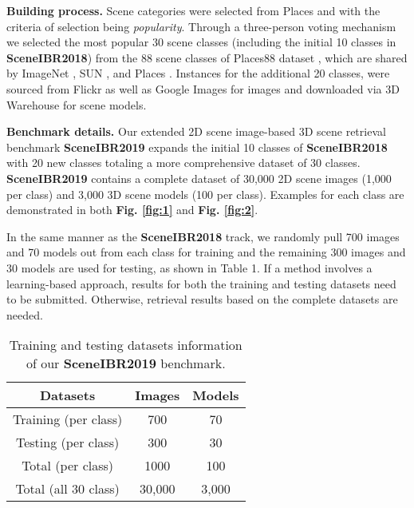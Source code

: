 \documentclass[../main.tex]{subfiles}
\begin{document}
\textbf{Building process.} 
Scene categories were selected from  Places \cite{zhou2017places} and with the criteria of selection being \textit{popularity}. Through a three-person voting mechanism we selected the most popular 30 scene classes (including the initial 10 classes in \textbf{SceneIBR2018}) from the 88 scene classes of Places88 dataset \cite{Places88}, which are shared by ImageNet \cite{ImageNet}, SUN \cite{SUN}, and Places \cite{zhou2017places}. 
Instances for the additional 20 classes, were sourced from Flickr \cite{Flickr} as well as Google Images\cite{GoogleImages} for images and downloaded via 3D Warehouse \cite{3DWarehouse} for scene models. 

\textbf{Benchmark details.} Our extended 2D scene image-based 3D scene retrieval benchmark \textbf{SceneIBR2019} expands the initial 10 classes of \textbf{SceneIBR2018} with 20 new classes totaling a more comprehensive dataset of 30 classes. \textbf{SceneIBR2019} contains a complete dataset of 30,000 2D scene images (1,000 per class) and 3,000 3D scene models (100 per class). Examples for each class are demonstrated in both \textbf{Fig. \ref{fig:1}} and \textbf{Fig. \ref{fig:2}}.

In the same manner as the \textbf{SceneIBR2018} track, we randomly pull 700 images and 70 models out from each class for training and the remaining 300 images and 30 models are used for testing, as shown in Table 1. If a method involves a learning-based approach, results for both the training and testing datasets need to be submitted. Otherwise, retrieval results based on the complete datasets are needed.


\begin{table}[h]
	\centering
	\caption{Training and testing datasets information of our \textbf{SceneIBR2019} benchmark.}
	\begin{center}
		\begin{tabular}  {|c|c|c|}
			\hline
			\textbf{\normalsize{Datasets}} & \textbf{\normalsize{Images}} & \textbf{\normalsize{Models}}\\
			\hline
			\normalsize{Training (per class)}  & 700  & 70  \\
			\hline
			\normalsize{Testing (per class)}  & 300  & 30  \\
			\hline
			\normalsize{Total (per class)}  & 1000  & 100  \\
			\hline
			\normalsize{Total (all 30 class)}  & 30,000  & 3,000  \\
			\hline
		\end{tabular}
	\end{center}
	\label{table1}
\end{table}
\end{document}
